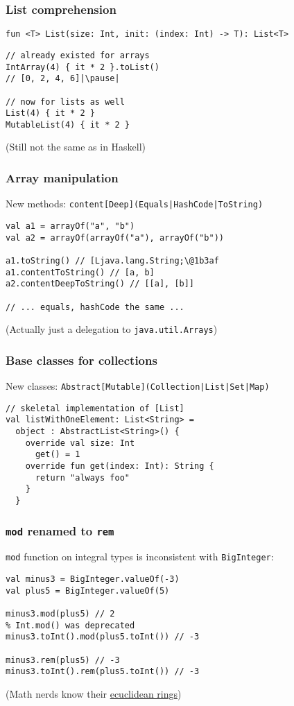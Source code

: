 \begin{frame}[fragile] \frametitle{List comprehension}
\footnotesize{\texttt{fun <T> List(size: Int, init: (index: Int) -> T): List<T>}}
\begin{lstlisting}
// already existed for arrays
IntArray(4) { it * 2 }.toList()
// [0, 2, 4, 6]|\pause|

// now for lists as well
List(4) { it * 2 }
MutableList(4) { it * 2 }
\end{lstlisting}
\small{(Still not the same as in Haskell)}
\end{frame}

\begin{frame}[fragile] \frametitle{Array manipulation}
New methods: \texttt{content[Deep](Equals|HashCode|ToString)}
\begin{lstlisting}
val a1 = arrayOf("a", "b")
val a2 = arrayOf(arrayOf("a"), arrayOf("b"))

a1.toString() // [Ljava.lang.String;\@1b3af
a1.contentToString() // [a, b]
a2.contentDeepToString() // [[a], [b]]

// ... equals, hashCode the same ...
\end{lstlisting}
\small{(Actually just a delegation to \texttt{java.util.Arrays})}
\end{frame}

\begin{frame}[fragile] \frametitle{Base classes for collections}
New classes: \texttt{Abstract[Mutable](Collection|List|Set|Map)}
\begin{lstlisting}
// skeletal implementation of [List]
val listWithOneElement: List<String> =
  object : AbstractList<String>() {
    override val size: Int
      get() = 1
    override fun get(index: Int): String {
      return "always foo"
    }
  }
\end{lstlisting}
\end{frame}

\begin{frame}[fragile] \frametitle{\texttt{mod} renamed to \texttt{rem}}
 \texttt{mod} function on integral types is inconsistent with \texttt{BigInteger}:
\begin{lstlisting}
val minus3 = BigInteger.valueOf(-3)
val plus5 = BigInteger.valueOf(5)

minus3.mod(plus5) // 2
% Int.mod() was deprecated
minus3.toInt().mod(plus5.toInt()) // -3

minus3.rem(plus5) // -3
minus3.toInt().rem(plus5.toInt()) // -3
\end{lstlisting}
\small{(Math nerds know their \href{https://www.microsoft.com/en-us/research/wp-content/uploads/2016/02/divmodnote-letter.pdf}{ecuclidean rings})}
\end{frame}
